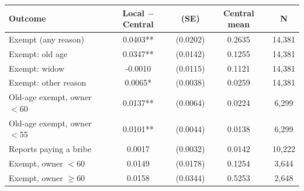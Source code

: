 \begin{tabular}{lcccc}
\hline
Outcome & Local $-$ Central & (SE) & Central mean & N \\
\hline
Exempt (any reason) & 0.0403** & (0.0202) & 0.2635 & 14,381 \\
Exempt: old age & 0.0347** & (0.0142) & 0.1255 & 14,381 \\
Exempt: widow & -0.0010 & (0.0115) & 0.1121 & 14,381 \\
Exempt: other reason & 0.0065* & (0.0038) & 0.0259 & 14,381 \\
Old-age exempt, owner $<$60 & 0.0137** & (0.0064) & 0.0224 & 6,299 \\
Old-age exempt, owner $<$55 & 0.0101** & (0.0044) & 0.0138 & 6,299 \\
Reports paying a bribe & 0.0017 & (0.0032) & 0.0142 & 10,222 \\
Exempt, owner $<$60 & 0.0149 & (0.0178) & 0.1254 & 3,644 \\
Exempt, owner $\geq$60 & 0.0158 & (0.0344) & 0.5253 & 2,648 \\
\hline
\end{tabular}
